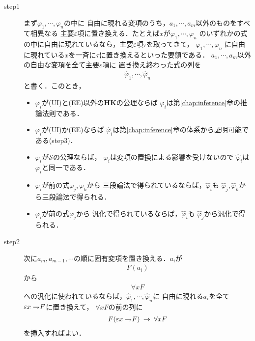 	\begin{description}
		\item[step1]
			まず$\varphi_{1},\cdots,\varphi_{n}$の中に
			自由に現れる変項のうち，$a_{1},\cdots,a_{m}$以外のものをすべて相異なる
			主要$\varepsilon$項に置き換える．たとえば$x$が$\varphi_{1},\cdots,\varphi_{n}$
			のいずれかの式の中に自由に現れているなら，主要$\varepsilon$項$\tau$を取ってきて，
			$\varphi_{1},\cdots,\varphi_{n}$
			に自由に現れている$x$を一斉に$\tau$に置き換えるといった要領である．
			$a_{1},\cdots,a_{m}$以外の自由な変項を全て主要$\varepsilon$項に
			置き換え終わった式の列を
			\begin{align}
				\hat{\varphi}_{1}, \cdots, \hat{\varphi}_{n}
			\end{align}
			と書く．このとき，
			\begin{itemize}
				\item $\varphi_{i}$が(UI)と(EE)以外の{\bf HK}の公理ならば
					$\hat{\varphi}_{i}$は第\ref{chap:inference}章の推論法則である．
				\item $\varphi_{i}$が(UI)か(EE)ならば
					$\hat{\varphi}_{i}$は第\ref{chap:inference}章の体系から証明可能である(step3)．
				\item $\varphi_{i}$が$\mathscr{S}$の公理ならば，
					$\varphi_{i}$は変項の置換による影響を受けないので
					$\hat{\varphi}_{i}$は$\varphi_{i}$と同一である．
				\item $\varphi_{i}$が前の式$\varphi_{j},\varphi_{k}$から
					三段論法で得られているならば，$\hat{\varphi}_{i}$も
					$\hat{\varphi}_{j},\hat{\varphi}_{k}$から三段論法で得られる．
				\item $\varphi_{i}$が前の式$\varphi_{j}$から
					汎化で得られているならば，$\hat{\varphi}_{i}$も
					$\hat{\varphi}_{j}$から汎化で得られる．
			\end{itemize}
			
		\item[step2]
			次に$a_{m},a_{m-1},\cdots$の順に固有変項を置き換える．$a_{i}$が
			\begin{align}
				F(a_{i})
			\end{align}
			から
			\begin{align}
				\forall x F
			\end{align}
			への汎化に使われているならば，$\hat{\varphi}_{1}, \cdots, \hat{\varphi}_{n}$に
			自由に現れる$a_{i}$を全て$\varepsilon x \rightharpoondown\hspace{-0.25em} F$に置き換えて，
			$\forall x F$の前の列に
			\begin{align}
				F(\varepsilon x \rightharpoondown\hspace{-0.25em} F) \hspace{0.25em}\rightarrow\hspace{0.25em} \forall x F
			\end{align}
			を挿入すればよい．
		

\end{description}
